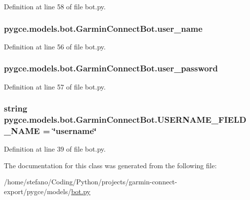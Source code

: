 Definition at line 58 of file bot.\+py.

\subsubsection[{\texorpdfstring{user\+\_\+name}{user_name}}]{\setlength{\rightskip}{0pt plus 5cm}pygce.\+models.\+bot.\+Garmin\+Connect\+Bot.\+user\+\_\+name}\hypertarget{classpygce_1_1models_1_1bot_1_1_garmin_connect_bot_a259da08c172fe9b54bbb6b997ab840a7}{}\label{classpygce_1_1models_1_1bot_1_1_garmin_connect_bot_a259da08c172fe9b54bbb6b997ab840a7}


Definition at line 56 of file bot.\+py.

\subsubsection[{\texorpdfstring{user\+\_\+password}{user_password}}]{\setlength{\rightskip}{0pt plus 5cm}pygce.\+models.\+bot.\+Garmin\+Connect\+Bot.\+user\+\_\+password}\hypertarget{classpygce_1_1models_1_1bot_1_1_garmin_connect_bot_af3d5c76d7e90a6aefe67926755d08c01}{}\label{classpygce_1_1models_1_1bot_1_1_garmin_connect_bot_af3d5c76d7e90a6aefe67926755d08c01}


Definition at line 57 of file bot.\+py.

\subsubsection[{\texorpdfstring{U\+S\+E\+R\+N\+A\+M\+E\+\_\+\+F\+I\+E\+L\+D\+\_\+\+N\+A\+ME}{USERNAME_FIELD_NAME}}]{\setlength{\rightskip}{0pt plus 5cm}string pygce.\+models.\+bot.\+Garmin\+Connect\+Bot.\+U\+S\+E\+R\+N\+A\+M\+E\+\_\+\+F\+I\+E\+L\+D\+\_\+\+N\+A\+ME = \char`\"{}username\char`\"{}\hspace{0.3cm}{\ttfamily [static]}}\hypertarget{classpygce_1_1models_1_1bot_1_1_garmin_connect_bot_a0128de4e9df3cd9171f697709b634865}{}\label{classpygce_1_1models_1_1bot_1_1_garmin_connect_bot_a0128de4e9df3cd9171f697709b634865}


Definition at line 39 of file bot.\+py.



The documentation for this class was generated from the following file\+:\begin{DoxyCompactItemize}
\item 
/home/stefano/\+Coding/\+Python/projects/garmin-\/connect-\/export/pygce/models/\hyperlink{bot_8py}{bot.\+py}\end{DoxyCompactItemize}
